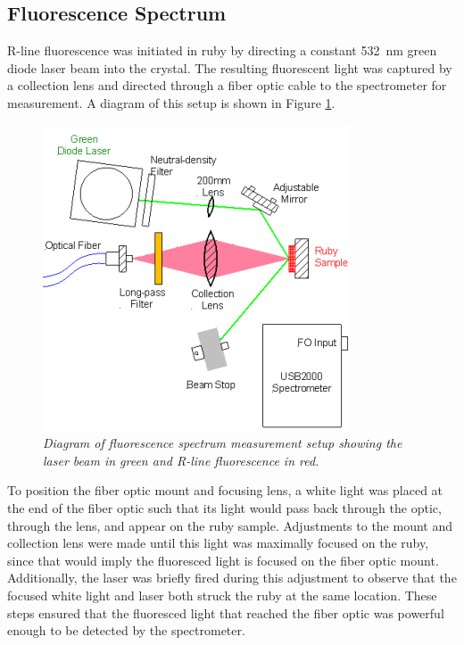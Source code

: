 \documentclass[11pt, a4paper, twocolumn]{article}
\begin{document}
\subsection*{Fluorescence Spectrum}
R-line fluorescence was initiated in ruby by directing a constant \SI{532}{\nm} green diode laser beam into the crystal. The resulting fluorescent light was captured by a collection lens and directed through a fiber optic cable to the spectrometer for measurement. A diagram of this setup is shown in Figure \ref{fig:laserBenchDiagram}.
\begin{figure}[]
\includegraphics[width=\linewidth]{laserBenchDiagram.png}
\caption{\textit{Diagram of fluorescence spectrum measurement setup showing the laser beam in green and R-line fluorescence in red.}
}
\label{fig:laserBenchDiagram}
\end{figure}
To position the fiber optic mount and focusing lens, a white light was placed at the end of the fiber optic such that its light would pass back through the optic, through the lens, and appear on the ruby sample. Adjustments to the mount and collection lens were made until this light was maximally focused on the ruby, since that would imply the fluoresced light is focused on the fiber optic mount. Additionally, the laser was briefly fired during this adjustment to observe that the focused white light and laser both struck the ruby at the same location. These steps ensured that the fluoresced light that reached the fiber optic was powerful enough to be detected by the spectrometer. 
\end{document}
